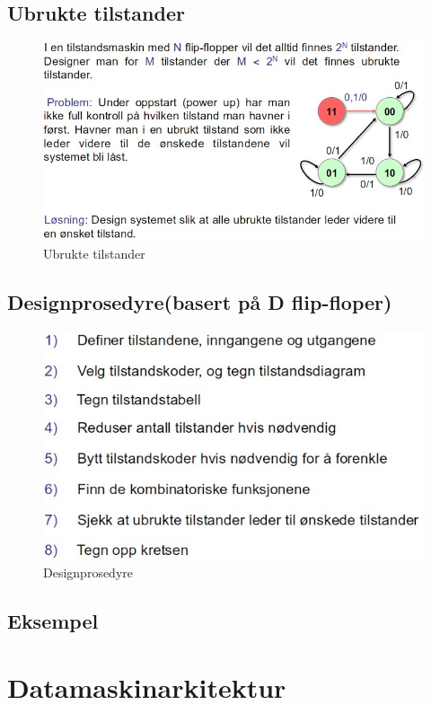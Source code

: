 \documentclass{article}
\begin{document}
	\subsection{Ubrukte tilstander}
	\begin{figure}[H]
		\includegraphics[scale = 0.6]{ubrukt.jpg}
		\caption{Ubrukte tilstander}
	\end{figure}
	
	\subsection{Designprosedyre(basert på D flip-floper)}
	\begin{figure}[H]
		\includegraphics[scale = 0.6]{prosedyre.jpg}
		\caption{Designprosedyre}
	\end{figure}
	
	\subsection{Eksempel}
	
	\section{Datamaskinarkitektur}
\end{document}

